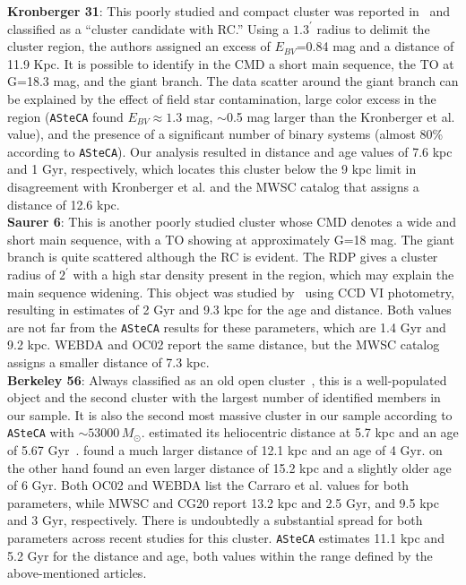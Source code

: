\documentclass{aa}
\begin{document}
\begin{appendix}
  \noindent \textbf{Kronberger 31}: This poorly studied and compact cluster was reported
  in~\cite{Kronberger_2006} and classified as a {``cluster candidate with
  RC.''} Using a $1.3^{\prime}$ radius to delimit the cluster region, the authors
  assigned an excess of $E_{BV}$=0.84 mag and a distance of 11.9 Kpc.
  It is possible to identify in the CMD a short main sequence, the TO at G=18.3
  mag, and the giant branch. The data scatter around the giant branch can be
  explained by the effect of field star contamination, large color excess in the
  region (\texttt{ASteCA} found $E_{BV}\approx1.3$ mag, $\sim$0.5 mag larger
  than the Kronberger et al. value), and the presence of a significant number of binary
  systems (almost 80\% according to \texttt{ASteCA}). Our analysis resulted in
  distance and age values of 7.6 kpc and 1 Gyr, respectively, which
  locates this cluster below the 9 kpc limit in disagreement with Kronberger et
  al. and the MWSC catalog that assigns a distance of 12.6 kpc.\\

  \noindent \textbf{Saurer 6}: This is another poorly studied cluster whose CMD denotes a
  wide and short main sequence, with a TO showing at approximately G=18 mag. The
  giant branch is quite scattered although the RC is evident.
  The RDP gives a cluster radius of $2^{\prime}$ with a high star density
  present in the region, which may explain the main sequence widening.
  This object was studied by~\cite{Frinchaboy_2002} using CCD VI photometry,
  resulting in estimates of 2 Gyr and 9.3 kpc for the age and distance.
  Both values are not far from the  \texttt{ASteCA} results for these parameters,
  which are 1.4 Gyr and 9.2 kpc. WEBDA and OC02 report the same distance, but
  the MWSC catalog assigns a smaller distance of 7.3 kpc.\\

  \noindent \textbf{Berkeley 56}: Always classified as an old open
  cluster~\citep[see, e.g., ][]{King_1964}, this is a well-populated object
  and the second cluster with the largest number of identified members in our
  sample. It is also the second most massive cluster in our sample according
  to \texttt{ASteCA} with $\sim53000\,M_{\odot}$.
  \cite{Janes_1994} estimated its heliocentric distance at 5.7 kpc and an age of
  5.67 Gyr~\citep[according to][]{Salaris_2004}. \cite{Carraro_2006} found a
  much larger distance of 12.1 kpc and an age of 4 Gyr. \cite{Janes_2011} on the
  other hand found an even larger distance of 15.2 kpc and a slightly older age
  of 6 Gyr.
  Both OC02 and WEBDA list the Carraro et al. values for both parameters, while
  MWSC and CG20 report 13.2 kpc and 2.5 Gyr, and 9.5 kpc and 3
  Gyr, respectively. There is undoubtedly a substantial spread for both
  parameters across recent studies for this cluster.
  \texttt{ASteCA} estimates 11.1 kpc and 5.2 Gyr for the distance and age,
  both values within the range defined by the above-mentioned articles.\\


\end{appendix}
\end{document}
